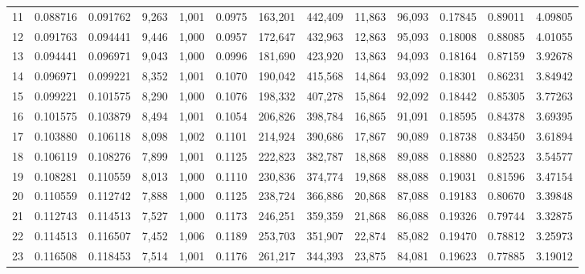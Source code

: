 \begin{tabular}{rrrrrrrrrrrrr}
11  &  0.088716 &  0.091762 &   9,263 &  1,001 &                                     0.0975 &  163,201 &  442,409 &   11,863 &   96,093 &  0.17845 &  0.89011 &  4.09805 \\
12  &  0.091763 &  0.094441 &   9,446 &  1,000 &                                     0.0957 &  172,647 &  432,963 &   12,863 &   95,093 &  0.18008 &  0.88085 &  4.01055 \\
13  &  0.094441 &  0.096971 &   9,043 &  1,000 &                                     0.0996 &  181,690 &  423,920 &   13,863 &   94,093 &  0.18164 &  0.87159 &  3.92678 \\
14  &  0.096971 &  0.099221 &   8,352 &  1,001 &                                     0.1070 &  190,042 &  415,568 &   14,864 &   93,092 &  0.18301 &  0.86231 &  3.84942 \\
15  &  0.099221 &  0.101575 &   8,290 &  1,000 &                                     0.1076 &  198,332 &  407,278 &   15,864 &   92,092 &  0.18442 &  0.85305 &  3.77263 \\
16  &  0.101575 &  0.103879 &   8,494 &  1,001 &                                     0.1054 &  206,826 &  398,784 &   16,865 &   91,091 &  0.18595 &  0.84378 &  3.69395 \\
17  &  0.103880 &  0.106118 &   8,098 &  1,002 &                                     0.1101 &  214,924 &  390,686 &   17,867 &   90,089 &  0.18738 &  0.83450 &  3.61894 \\
18  &  0.106119 &  0.108276 &   7,899 &  1,001 &                                     0.1125 &  222,823 &  382,787 &   18,868 &   89,088 &  0.18880 &  0.82523 &  3.54577 \\
19  &  0.108281 &  0.110559 &   8,013 &  1,000 &                                     0.1110 &  230,836 &  374,774 &   19,868 &   88,088 &  0.19031 &  0.81596 &  3.47154 \\
20  &  0.110559 &  0.112742 &   7,888 &  1,000 &                                     0.1125 &  238,724 &  366,886 &   20,868 &   87,088 &  0.19183 &  0.80670 &  3.39848 \\
21  &  0.112743 &  0.114513 &   7,527 &  1,000 &                                     0.1173 &  246,251 &  359,359 &   21,868 &   86,088 &  0.19326 &  0.79744 &  3.32875 \\
22  &  0.114513 &  0.116507 &   7,452 &  1,006 &                                     0.1189 &  253,703 &  351,907 &   22,874 &   85,082 &  0.19470 &  0.78812 &  3.25973 \\
23  &  0.116508 &  0.118453 &   7,514 &  1,001 &                                     0.1176 &  261,217 &  344,393 &   23,875 &   84,081 &  0.19623 &  0.77885 &  3.19012 \\

\end{tabular}
